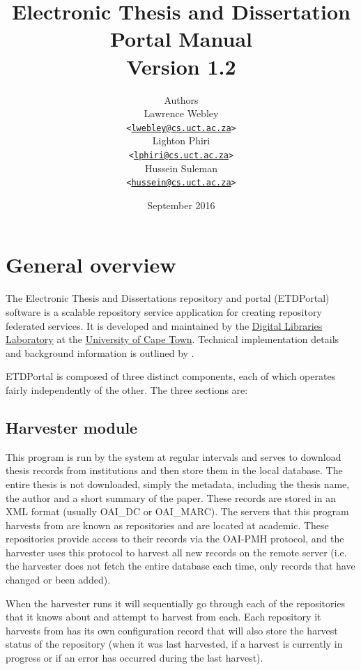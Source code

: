 \documentclass[a4paper,11pt]{article}
\title{Electronic Thesis and Dissertation Portal Manual\\Version 1.2}
\author{
Authors\\
Lawrence Webley\\
\texttt{<\href{mailto:lwebley@cs.uct.ac.za}{lwebley@cs.uct.ac.za}>} \\
Lighton Phiri\\
\texttt{<\href{mailto:lphiri@cs.uct.ac.za}{lphiri@cs.uct.ac.za}>} \\
Hussein Suleman\\ 
\texttt{<\href{mailto:hussein@cs.uct.ac.za}{hussein@cs.uct.ac.za}>} \\
}
\date
{
September 2016
}
\begin{document}
\maketitle
\thispagestyle{empty}
\newpage
\tableofcontents
\thispagestyle{empty}
\newpage

\section{General overview}
\label{sec:general_overview}

The Electronic Thesis and Dissertations repository and portal (ETDPortal) software is a scalable repository service application for creating repository federated services. It is developed and maintained by the \href{http://dl.cs.uct.ac.za}{Digital Libraries Laboratory} at the \href{http://www.uct.ac.za}{University of Cape Town}. Technical implementation details and background information is outlined by \citep{Webley2011}.

ETDPortal is composed of three distinct components, each of which operates fairly independently of the other. The three sections are:

\subsection{Harvester module}
\label{sec:general_overview:harvester_module}

This program is run by the system at regular intervals and serves to download thesis records from institutions and then store them in the local database. The entire thesis is not downloaded, simply the metadata, including the thesis name, the author and a short summary of the paper. These records are stored in an XML format (usually OAI\_DC or OAI\_MARC). The servers that this program harvests from are known as repositories and are located at academic. These repositories provide access to their records via the OAI-PMH protocol, and the harvester uses this protocol to harvest all new records on the remote server (i.e. the harvester does not fetch the entire database each time, only records that have changed or been added).

When the harvester runs it will sequentially go through each of the repositories that it knows about and attempt to harvest from each. Each repository it harvests from has its own configuration record that will also store the harvest status of the repository (when it was last harvested, if a harvest is currently in progress or if an error has occurred during the last harvest).
\end{document}
